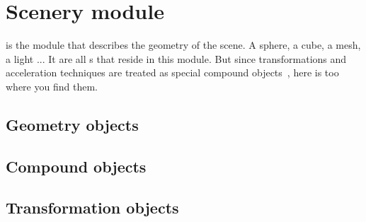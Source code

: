 %

\chapter{Scenery module}

 is the module that describes the geometry of the scene.  A sphere, a cube, a mesh, a light ...  It are all s that reside in this module.  But since transformations and acceleration techniques are treated as special compound objects~\cite{kirk88ray}, here is too where you find them.

\section{Geometry objects}

\section{Compound objects}

\section{Transformation objects}
